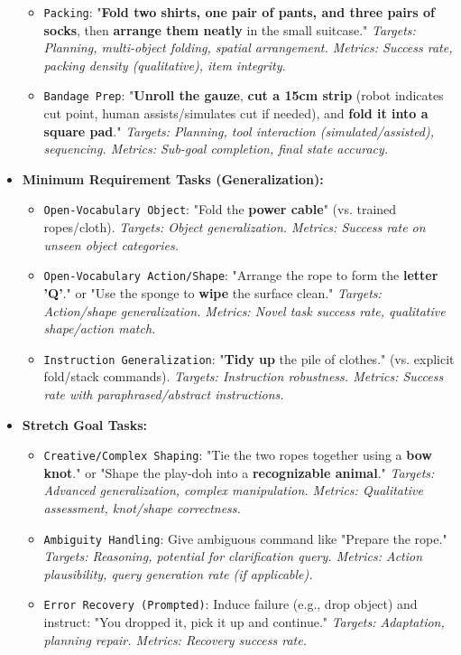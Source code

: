 \begin{itemize}
\begin{itemize}
            \item \texttt{Packing}: "\textbf{Fold two shirts, one pair of pants, and three pairs of socks}, then \textbf{arrange them neatly} in the small suitcase." \textit{Targets: Planning, multi-object folding, spatial arrangement. Metrics: Success rate, packing density (qualitative), item integrity.}
            \item \texttt{Bandage Prep}: "\textbf{Unroll the gauze}, \textbf{cut a 15cm strip} (robot indicates cut point, human assists/simulates cut if needed), and \textbf{fold it into a square pad}." \textit{Targets: Planning, tool interaction (simulated/assisted), sequencing. Metrics: Sub-goal completion, final state accuracy.}
        \end{itemize}
    \item \textbf{Minimum Requirement Tasks (Generalization):}
        \begin{itemize}
            \item \texttt{Open-Vocabulary Object}: "Fold the \textbf{power cable}" (vs. trained ropes/cloth). \textit{Targets: Object generalization. Metrics: Success rate on unseen object categories.}
            \item \texttt{Open-Vocabulary Action/Shape}: "Arrange the rope to form the \textbf{letter 'Q'}." or "Use the sponge to \textbf{wipe} the surface clean." \textit{Targets: Action/shape generalization. Metrics: Novel task success rate, qualitative shape/action match.}
            \item \texttt{Instruction Generalization}: "\textbf{Tidy up} the pile of clothes." (vs. explicit fold/stack commands). \textit{Targets: Instruction robustness. Metrics: Success rate with paraphrased/abstract instructions.}
        \end{itemize}
    \item \textbf{Stretch Goal Tasks:}
        \begin{itemize}
            \item \texttt{Creative/Complex Shaping}: "Tie the two ropes together using a \textbf{bow knot}." or "Shape the play-doh into a \textbf{recognizable animal}." \textit{Targets: Advanced generalization, complex manipulation. Metrics: Qualitative assessment, knot/shape correctness.}
            \item \texttt{Ambiguity Handling}: Give ambiguous command like "Prepare the rope." \textit{Targets: Reasoning, potential for clarification query. Metrics: Action plausibility, query generation rate (if applicable).}
            \item \texttt{Error Recovery (Prompted)}: Induce failure (e.g., drop object) and instruct: "You dropped it, pick it up and continue." \textit{Targets: Adaptation, planning repair. Metrics: Recovery success rate.}
        \end{itemize}
\end{itemize}